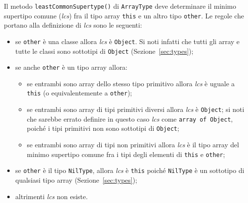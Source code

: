 Il metodo \texttt{leastCommonSupertype()} di
\texttt{ArrayType} deve determinare il minimo supertipo comune
(\emph{lcs}) fra il tipo array \texttt{this} e un altro tipo \texttt{other}.
Le regole che portano alla definizione di \emph{lcs} sono le seguenti:
%
\begin{itemize}
\item se \texttt{other} \`e una classe allora \emph{lcs} \`e \texttt{Object}.
      Si noti infatti che tutti gli array e tutte le classi sono
      sottotipi di \texttt{Object} (Sezione~\ref{sec:types});
\item se anche \texttt{other} \`e un tipo array allora:
      \begin{itemize}
      \item se entrambi sono array dello stesso tipo primitivo
            allora \emph{lcs} \`e uguale
            a \texttt{this} (o equivalentemente a \texttt{other});
      \item se entrambi sono array di tipi primitivi diversi
            allora \emph{lcs} \`e \texttt{Object}; si noti che sarebbe
            errato definire in questo caso \emph{lcs} come
            \texttt{array of Object}, poich\'e i tipi primitivi non sono
            sottotipi di \texttt{Object};
      \item se entrambi sono array di tipi non primitivi
            allora \emph{lcs} \`e il tipo array del minimo supertipo comune
            fra i tipi degli elementi di \texttt{this} e \texttt{other};
      \end{itemize}
\item se \texttt{other} \`e il tipo \texttt{NilType}, allora
      \emph{lcs} \`e \texttt{this} poich\'e \texttt{NilType} \`e un
      sottotipo di qualsiasi tipo array (Sezione~\ref{sec:types});
\item altrimenti \emph{lcs} non esiste.
\end{itemize}

